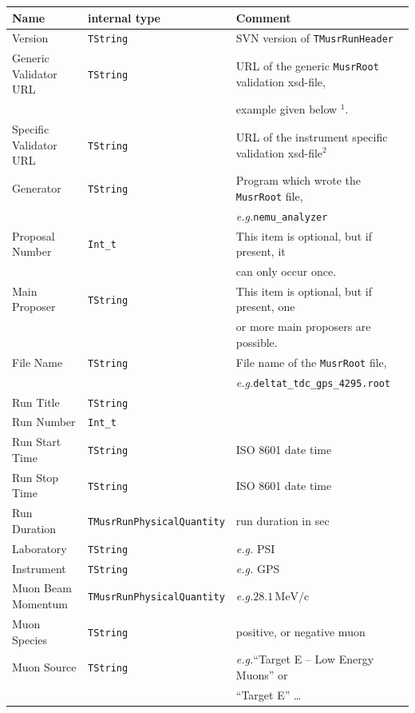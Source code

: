 \documentclass[twoside]{article}
\newcommand{\musrroot}{\texttt{MusrRoot}\xspace}
\newcommand{\eg}{\emph{e.g.}\xspace}
\newcommand{\tmrh}{\texttt{TMusrRunHeader}\xspace}
\newcommand{\tstring}{\texttt{TString}\xspace}
\newcommand{\tquant}{\texttt{TMusrRunPhysicalQuantity}\xspace}
\begin{document}
\begin{small}
\begin{tabular}{l|l|l}
Name           & internal type & Comment \\ \hline\hline
Version        & \tstring      & SVN version of \tmrh \\
Generic Validator URL & \tstring & URL of the generic \musrroot validation xsd-file, \\
               &               & example given below $^1$. \\
Specific Validator URL & \tstring & URL of the instrument specific validation xsd-file$^2$ \\
Generator      & \tstring      & Program which wrote the \musrroot file, \\
               &               & \eg \verb!nemu_analyzer! \\
Proposal Number & \verb!Int_t! & This item is optional, but if present, it \\
               &               & can only occur once. \\
Main Proposer  & \tstring      & This item is optional, but if present, one \\
               &               & or more main proposers are possible. \\               
File Name      & \tstring      & File name of the \musrroot file, \\
               &               & \eg \verb!deltat_tdc_gps_4295.root! \\
Run Title      & \tstring      & \\
Run Number     & \verb!Int_t!  & \\
Run Start Time & \tstring      & ISO 8601 date time \\
Run Stop Time  & \tstring      & ISO 8601 date time \\
Run Duration   & \tquant       & run duration in sec \\
Laboratory     & \tstring      & \eg PSI \\
Instrument     & \tstring      & \eg GPS \\
Muon Beam Momentum & \tquant    & \eg $28.1\,\mathrm{MeV/c}$ \\
Muon Species   & \tstring      & positive, or negative muon \\
Muon Source    & \tstring      & \eg ``Target E -- Low Energy Muons'' or \\
               &               & ``Target E'' \ldots \\

\end{tabular}
\end{small}
\end{document}
